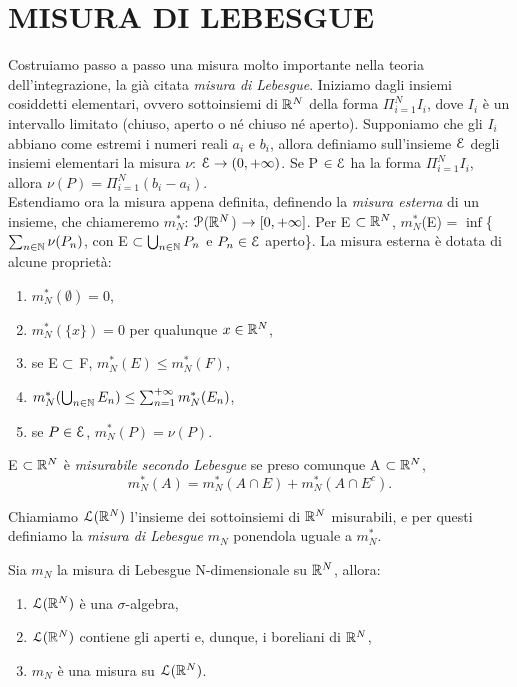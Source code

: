 \documentclass[Completo.tex]{subfiles}
\begin{document}
\section{MISURA DI LEBESGUE}
Costruiamo passo a passo una misura molto importante nella teoria dell'integrazione, la già citata \textit{misura di Lebesgue}. Iniziamo dagli insiemi cosiddetti elementari, ovvero sottoinsiemi di $\bb[R]^{N}$ della forma $\Pi_{i=1}^N I_i$, dove $I_i$ è un intervallo limitato (chiuso, aperto o né chiuso né aperto). Supponiamo che gli $I_i$ abbiano come estremi i numeri reali $a_i$ e $b_i$, allora definiamo sull'insieme $\eu[E]$ degli insiemi elementari la misura $\nu$: $\eu[E] \ra (0, +\infty)$. Se P $\in \eu[E]$ ha la forma $\Pi_{i=1}^N I_i$, allora $\nu(P) = \Pi_{i=1}^{N} (b_i-a_i)$. \\
Estendiamo ora la misura appena definita, definendo la \textit{misura esterna} di un insieme, che chiameremo $m_N^{*}$: $\eu[P]$($\bb[R]^{N}$) $\rightarrow [0, +\infty]$. Per E $\sset \bb[R]^{N}$, $m_N^{*}$(E) = $\inf$\{$\sum_{n \in \bb[N]} \nu(P_n)$, con E $\sset \bigcup_{n \in \bb[N]} P_n$ e $P_n \in \eu[E]$ aperto\}. La misura esterna è dotata di alcune proprietà:
\begin{Prop}
	\begin{enumerate}
		\item $m_N^{*}(\emptyset) = 0$,
		\item $m_N^{*}(\{x\}) = 0$ per qualunque $x \in \bb[R]^{N}$,
		\item se E $\subset$ F, $m_N^{*}(E) \leq m_N^{*}(F)$,
		\item $m_N^{*}(\bigcup_{n \in \bb[N]}E_n) \leq \sum_{n=1}^{+\infty} m_N^{*}(E_n)$,
		\item se $P \in \eu[E]$, $m_N^{*}(P) = \nu(P)$.
	\end{enumerate}
\end{Prop}
\begin{Def}
	E $\sset \bb[R]^{N}$ è \textit{misurabile secondo Lebesgue} se preso comunque A $\sset \bb[R]^{N}$,
	\begin{equation*}
	m_N^{*}(A) = m_N^{*}(A\cap E) + m_N^{*}(A \cap E^{c}).
	\end{equation*}
\end{Def}
\begin{Def}
	Chiamiamo $\eu[L](\bb[R]^{N})$ l'insieme dei sottoinsiemi di $\bb[R]^{N}$ misurabili, e per questi definiamo la \textit{misura di Lebesgue} $m_N$ ponendola uguale a $m_N^{*}$.
\end{Def}
\begin{Th}
	Sia $m_N$ la misura di Lebesgue N-dimensionale su $\bb[R]^{N}$, allora:
	\begin{enumerate}
		\item $\eu[L](\bb[R]^{N})$ è una $\sigma$-algebra,
		\item $\eu[L](\bb[R]^{N})$ contiene gli aperti e, dunque, i boreliani di $\bb[R]^{N}$,
		\item $m_N$ è una misura su $\eu[L](\bb[R]^{N})$.
	\end{enumerate}
\end{Th}
\end{document}
